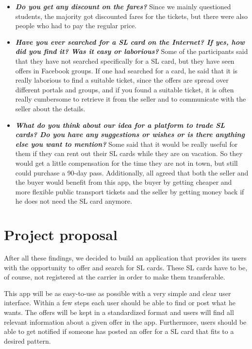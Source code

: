 \documentclass[11pt,twoside,a4paper]{report}
\begin{document}
\begin{itemize}
\item \textbf{\textit{Do you get any discount on the fares?}} Since we mainly questioned students, the majority got discounted fares for the tickets, but there were also people who had to pay the regular price.
\item \textbf{\textit{Have you ever searched for a SL card on the Internet? If yes, how did you find it? Was it easy or laborious?}} Some of the participants said that they have not searched specifically for a SL card, but they have seen offers in Facebook groups. If one had searched for a card, he said that it is really laborious to find a suitable ticket, since the offers are spread over different portals and groups, and if you found a suitable ticket, it is often really cumbersome to retrieve it from the seller and to communicate with the seller about the details.
\item \textbf{\textit{What do you think about our idea for a platform to trade SL cards? Do you have any suggestions or wishes or is there anything else you want to mention?}} Some said that it would be really useful for them if they can rent out their SL cards while they are on vacation. So they would get a little compensation for the time they are not in town, but still could purchase a 90-day pass. Additionally, all agreed that both the seller and the buyer would benefit from this app, the buyer by getting cheaper and more flexible public transport tickets and the seller by getting money back if he does not need the SL card anymore.
\end{itemize}

\section{Project proposal}

After all these findings, we decided to build an application that provides its users with the opportunity to offer and search for SL cards. These SL cards have to be, of course, not registered at the carrier in order to make them transferable.

This app will be as easy-to-use as possible with a very simple and clear user interface. Within a few steps each user should be able to find or post what he wants. The offers will be kept in a standardized format and users will find all relevant information about a given offer in the app. Furthermore, users should be able to get notified if someone has posted an offer for a SL card that fits to a desired pattern.
\end{document}

